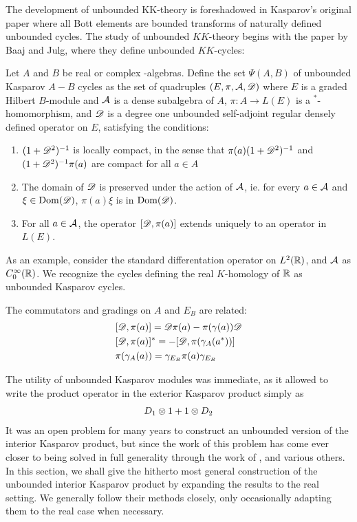 The development of unbounded KK-theory is foreshadowed in Kasparov's original paper \cite{kasparov} where all Bott elements are bounded transforms of naturally defined unbounded cycles. The study of unbounded $KK$-theory begins with the paper by Baaj and Julg, \cite{baajjulg} where they define unbounded $KK$-cycles:
\begin{definition}
	Let $A$ and $B$ be real or complex \Cstar-algebras.
	Define the set $\Psi(A,B)$ of unbounded Kasparov $A-B$ cycles as the set of quadruples $(E,\pi,\mathcal{A},\mathscr{D})$ where $E$ is a graded Hilbert $B$-module and $\mathcal{A}$ is a dense subalgebra of $A$, $\pi:A\to L(E)$ is a $^*$-homomorphism, and $\mathscr{D}$ is a degree one unbounded self-adjoint regular densely defined operator on $E$, satisfying the conditions: 
	\begin{enumerate}
		\item $(1+\mathscr{D}^2)^{-1}$ is locally compact, in the sense that $\pi(a)(1+\mathscr{D}^2)^{-1}$ and $(1+\mathscr{D}^2)^{-1}\pi(a)$ are compact for all $a\in A$ 
		\item The domain of $\mathscr{D}$ is preserved under the action of $\mathcal{A}$, ie. for every $a\in \mathcal{A}$ and $\xi \in \operatorname{Dom}(\mathscr{D})$, $\pi(a)\xi$ is in $\operatorname{Dom}(\mathscr{D})$. 
		\item For all $a\in \mathcal{A}$, the operator $[\mathscr{D},\pi(a)]$ extends uniquely to an operator in $L(E)$. 
	\end{enumerate}
\end{definition}
As an example, consider the standard differentation operator on $L^2(\mathbb{R})$, and $\mathcal{A}$ as $C_0^\infty(\mathbb{R})$.  
We recognize the cycles defining the real $K$-homology of $\mathbb{R}$ as unbounded Kasparov cycles.
\begin{remark}
	The commutators and gradings on $A$ and $E_B$ are related: 
	\begin{align*}
		&[\mathscr{D},\pi(a)]=\mathscr{D}\pi(a)-\pi(\gamma(a))\mathscr{D} \\
		&[\mathscr{D},\pi(a)]^*=-[\mathscr{D},\pi(\gamma_A(a^*))] \\
		&\pi(\gamma_A(a))=\gamma_{E_B}\pi(a)\gamma_{E_B}
	\end{align*}
\end{remark}
The utility of unbounded Kasparov modules was immediate, as it allowed \cite{baajjulg} to write the product operator in the exterior Kasparov product simply as 
\begin{align*}
	D_1\otimes 1+1\otimes D_2
\end{align*}
It was an open problem for many years to construct an unbounded version of the interior Kasparov product, but since the work of \cite{mesland} this problem has come ever closer to being solved in full generality through the work of \cite{kaad}, \cite{suijlekom} and various others. In this section, we shall give the hitherto most general construction of the unbounded interior Kasparov product by expanding the results  \cite{mesrennie}  to the real setting. We generally follow their methods closely, only occasionally adapting them to the real case when necessary. 


